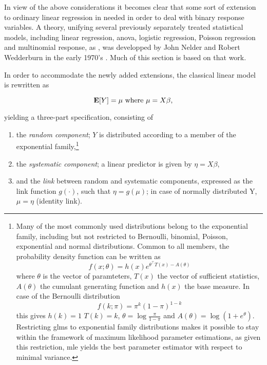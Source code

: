 In view of the above considerations it becomes clear that some sort of extension to ordinary linear regression in needed in order to deal with binary response variables. A theory, unifying several previously separately treated statistical models, including linear regression, \gls{anova}, logistic regression, Poisson regression and multinomial response, as , was developped by John Nelder and Robert Wedderburn in the early 1970's \citep{Nelder1972}. Much of this section is based on that work.

In order to accommodate the newly added extensions, the classical linear model is rewritten as

\begin{equation}
  \operatorname{\mathbf{E}}[Y] = \mu \text{ where } \mu = X \beta,
\end{equation}

yielding a three-part specification, consisting of

\begin{enumerate}[label=(\alph*)]
  \item the \textit{random component}; $Y$ is distributed according to a member of the exponential family,\footnote{Many of the most commonly used distributions belong to the exponential family, including but not restricted to Bernoulli, binomial, Poisson, exponential and normal distributions. Common to all members, the probability density function can be written as
  \begin{equation}
    f(x;\theta) = h(x) e^{\theta^\intercal T(x)-A(\theta)}
  \end{equation}
  where $\theta$ is the vector of paramteters, $T(x)$ the vector of sufficient statistics, $A(\theta)$ the cumulant generating function and $h(x)$ the base measure. In case of the Bernoulli distribution
  \begin{equation}
    f(k;\pi) = \pi^k (1-\pi)^{1-k}\label{eq:bern-pmf}
  \end{equation}
  this gives $h(k) = 1$ $T(k) = k$, $\theta = \log\frac{\pi}{1-\pi}$ and $A(\theta) = \log(1+e^\theta)$. Restricting \glspl{glm} to exponential family distributions makes it possible to stay within the framework of maximum likelihood parameter estimations, as given this restriction, \gls{mle} yields the best parameter estimator with respect to minimal variance.}
  \item the \textit{systematic component}; a linear predictor is given by $\eta = X\beta$,
  \item and the \textit{link} between random and systematic components, expressed as the link function $g(\cdot)$, such that $\eta = g(\mu)$; in case of normally distributed Y, $\mu = \eta$ (identity link).
\end{enumerate}

